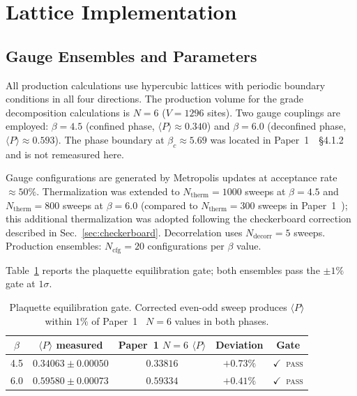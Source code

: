 \documentclass[12pt]{article}
\theoremstyle{definition}
\theoremstyle{remark}
\newcommand{\Ncfg}{N_{\mathrm{cfg}}}                  %
\newcommand{\Ntherm}{N_{\mathrm{therm}}}              %
\begin{document}
	\section{Lattice Implementation}
	\label{sec:lattice}
	
	\subsection{Gauge Ensembles and Parameters}
	\label{sec:ensembles}
	
	All production calculations use hypercubic lattices with periodic boundary
	conditions in all four directions.  The production volume for the grade
	decomposition calculations is $N=6$ ($V=1296$ sites).  Two gauge couplings
	are employed: $\beta=4.5$ (confined phase, $\langle P\rangle\approx0.340$)
	and $\beta=6.0$ (deconfined phase, $\langle P\rangle\approx0.593$).  The
	phase boundary at $\beta_c\approx5.69$ was located in
	Paper~1~\cite{FirestoneP1}~\S4.1.2 and is not remeasured here.
	
	Gauge configurations are generated by Metropolis updates at acceptance
	rate $\approx50\%$.  Thermalization was extended to $\Ntherm=1000$ sweeps
	at $\beta=4.5$ and $\Ntherm=800$ sweeps at $\beta=6.0$ (compared to
	$\Ntherm=300$ sweeps in Paper~1~\cite{FirestoneP1}); this additional
	thermalization was adopted following the checkerboard correction described
	in Sec.~\ref{sec:checkerboard}.  Decorrelation uses $N_{\mathrm{decorr}}=5$
	sweeps.  Production ensembles: $\Ncfg=20$ configurations per $\beta$ value.
	
	Table~\ref{tab:plaquette-gate} reports the plaquette equilibration gate;
	both ensembles pass the $\pm1\%$ gate at $1\sigma$.
	
	\begin{table}[ht]
		\centering
		\caption{Plaquette equilibration gate.  Corrected even-odd sweep produces
			$\langle P\rangle$ within $1\%$ of Paper~1~\cite{FirestoneP1} $N=6$
			values in both phases.}
		\label{tab:plaquette-gate}
		\begin{tabular}{@{}ccccc@{}}
			\toprule
			$\beta$ & $\langle P\rangle$ measured
			& Paper~1 $N=6$ $\langle P\rangle$
			& Deviation & Gate \\
			\midrule
			4.5 & $0.34063\pm0.00050$ & $0.33816$ & $+0.73\%$
			& $\checkmark$~\textsc{pass} \\
			6.0 & $0.59580\pm0.00073$ & $0.59334$ & $+0.41\%$
			& $\checkmark$~\textsc{pass} \\
			\bottomrule
		\end{tabular}
	\end{table}
	
\end{document}
